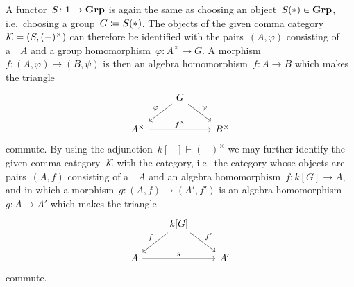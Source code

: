 A functor~$S \colon 1 \to \mathbf{Grp}$ is again the same as choosing an object~$S(\ast) \in \mathbf{Grp}$, i.e.\ choosing a group~$G \coloneqq S(\ast)$.
The objects of the given comma category~$\mathcal{K} = (S, (-)^\times)$ can therefore be identified with the pairs~$(A,\varphi)$ consisting of a~{\kalg}~$A$ and a group homomorphism~$\varphi \colon A^\times \to G$.
A morphism~$f \colon (A, \varphi) \to (B, \psi)$ is then an algebra homomorphism~$f \colon A \to B$ which makes the triangle
\[
  \begin{tikzcd}
      {}
    & G
      \arrow{dl}[above left]{\varphi}
      \arrow{dr}[above right]{\psi}
    & {}
    \\
      A^\times
      \arrow{rr}[above]{f^\times}
    & {}
    & B^\times
  \end{tikzcd}
\]
commute.
By using the adjunction~$k[-] \vdash (-)^\times$ we may further identify the given comma category~$\mathcal{K}$ with the  category, i.e.\ the category whose objects are pairs~$(A,f)$ consisting of a~{\kalg}~$A$ and an algebra homomorphism~$f \colon k[G] \to A$, and in which a morphism~$g \colon (A,f) \to (A', f')$ is an algebra homomorphism~$g \colon A \to A'$ which makes the triangle
\[
  \begin{tikzcd}
      {}
    & k[G]
      \arrow{dl}[above left]{f}
      \arrow{dr}[above right]{f'}
    & {}
    \\
      A
      \arrow{rr}[above]{g}
    & {}
    & A'
  \end{tikzcd}
\]
commute.




